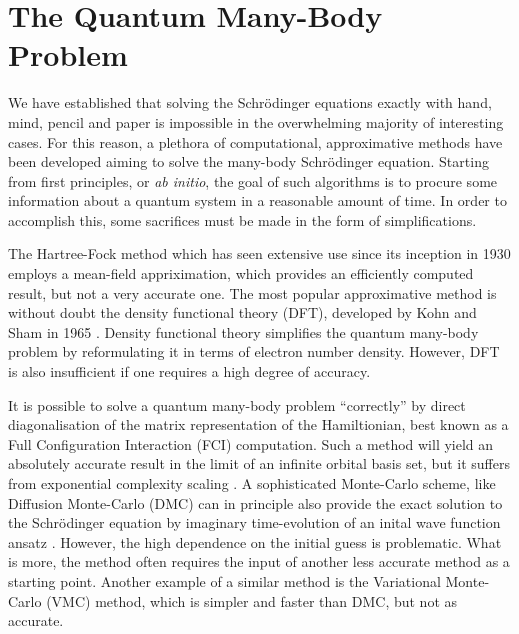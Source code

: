 \section{The Quantum Many-Body Problem}

    We have established that solving the Schrödinger equations exactly with hand, mind, 
    pencil and paper is 
    impossible in the overwhelming majority of interesting cases. For this reason, 
    a plethora of computational, approximative methods have been developed aiming 
    to solve the many-body Schrödinger equation. Starting from first principles,
    or \emph{ab initio}, the goal of such algorithms is to procure some information
    about a quantum system in a reasonable amount of time. In order to accomplish 
    this, some sacrifices must be made in the form of simplifications. 

    The Hartree-Fock
    method \cite{hartree1928wave,fock1930naherungsmethode,szabo2012modern} which 
    has seen extensive use since its inception in 1930
    employs a mean-field appriximation, which provides an efficiently computed result, 
    but not a very accurate one. The most popular approximative method is without doubt 
    the density functional theory (DFT), developed by Kohn and Sham in
    1965 \cite{kohn1965self}. Density functional theory simplifies the quantum many-body problem by reformulating 
    it in terms of electron number density. However, DFT is also insufficient if one requires a 
    high degree of accuracy.

    It is possible to solve a quantum many-body problem  ``correctly'' by direct diagonalisation 
    of the matrix representation of the Hamiltionian, best known as a Full Configuration Interaction
    (FCI) computation. Such a method 
    will yield an absolutely accurate result in the limit of an infinite orbital basis set,
    but it suffers from exponential complexity scaling \cite{helgaker2014molecular}.
    A sophisticated Monte-Carlo scheme, like Diffusion Monte-Carlo (DMC) can in principle 
    also provide the exact solution to the Schrödinger equation by imaginary time-evolution 
    of an inital wave function ansatz \cite{hammond1994monte}. However, the high dependence on the 
    initial guess is problematic. What is more, the method often requires the input of
    another less accurate method as a starting point. Another 
    example of a similar method is the Variational Monte-Carlo (VMC) method, which is
    simpler and faster than DMC, but not as accurate.

